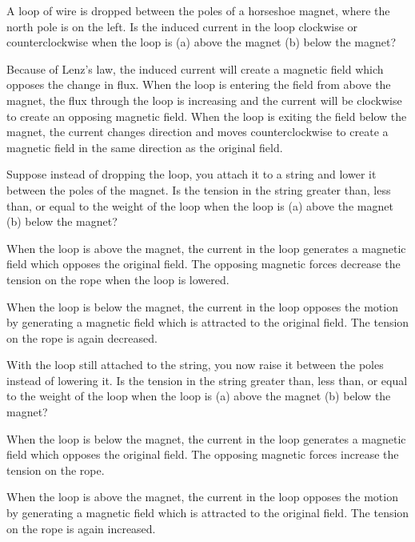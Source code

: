 \documentclass{exam}
\begin{document}
\begin{questions}
\question A loop of wire is dropped between the poles of a horseshoe magnet, where the north pole is on the left.  Is
the induced current in the loop clockwise or counterclockwise when the loop is (a) above the magnet (b) below the
magnet?

\begin{solution}
Because of Lenz's law, the induced current will create a magnetic field which opposes the change in flux.  When the loop
is entering the field from above the magnet, the flux through the loop is increasing and the current will be
clockwise to create an opposing magnetic field.  When the loop is exiting the field below the magnet, the current
changes direction and moves counterclockwise to create a magnetic field in the same direction as the original field. 
\end{solution}

\question
Suppose instead of dropping the loop, you attach it to a string and lower it between the poles of the magnet.  Is the
tension in the string greater than, less than, or equal to the weight of the loop when the loop is (a) above the magnet
(b) below the magnet? 

\begin{solution}
When the loop is above the magnet, the current in the loop generates a magnetic field which opposes the original field.
The opposing magnetic forces decrease the tension on the rope when the loop is lowered.

When the loop is below the magnet, the current in the loop opposes the motion by generating a magnetic field which is
attracted to the original field.  The tension on the rope is again decreased.

\end{solution}

\question
With the loop still attached to the string, you now raise it between the poles instead of lowering it.  Is the
tension in the string greater than, less than, or equal to the weight of the loop when the loop is (a) above the magnet
(b) below the magnet? 

\begin{solution}
When the loop is below the magnet, the current in the loop generates a magnetic field which opposes the original field.
The opposing magnetic forces increase the tension on the rope.

When the loop is above the magnet, the current in the loop opposes the motion by generating a magnetic field which is
attracted to the original field.  The tension on the rope is again increased.

\end{solution}

\end{questions}
\end{document}
